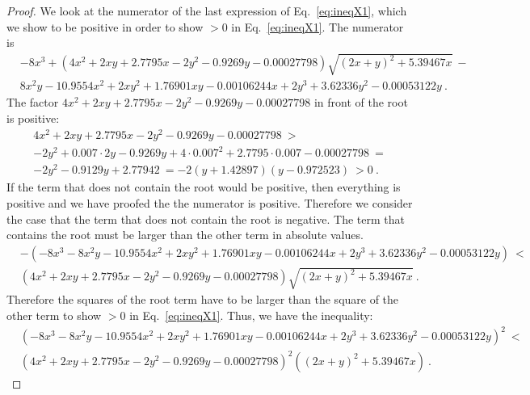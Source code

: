 \documentclass{article}
\begin{document}
\begin{proof}
We look at the numerator of the last expression of 
Eq.~\eqref{eq:ineqX1}, which we show to be
positive in order to show $>0$ in 
Eq.~\eqref{eq:ineqX1}. The numerator is 
\begin{align}
&-8 x^3+\left(4 x^2+2 x y+2.7795 x-2 y^2-0.9269 y-0.00027798\right) \sqrt{(2 x+y)^2+5.39467 x}\ -\\\nonumber &8 x^2 y-10.9554 x^2+2 x y^2+1.76901 x y-0.00106244 x+2 y^3+3.62336 y^2-0.00053122 y \ .
\end{align}
The factor $4 x^2+2 x y+2.7795 x-2 y^2-0.9269 y-0.00027798$
in front of the root is positive:
\begin{align}
4 x^2+2 x y+2.7795 x-2 y^2-0.9269 y-0.00027798 \ > \\ \nonumber
-2 y^2+0.007 \cdot 2 y-0.9269 y+4 \cdot 0.007^2+2.7795 \cdot 0.007-0.00027798  \ = \\ \nonumber
-2 y^2-0.9129 y+2.77942 \ = -2 (y + 1.42897)(y - 0.972523) \ > 0 \ .
\end{align}
If the term that does not contain the root would be positive, 
then everything is positive and we have proofed the the numerator is
positive. Therefore we consider the case that the term that does
not contain the root is negative.
The term that contains the root must be larger than 
the other term in absolute values. 
\begin{align}
&-\left(-8 x^3-8 x^2 y-10.9554 x^2+2 x y^2+1.76901 x y-0.00106244 x+2 y^3+3.62336 y^2-0.00053122 y\right)\ < \\ \nonumber &\left(4 x^2+2 x y+2.7795 x-2 y^2-0.9269 y-0.00027798\right) \sqrt{(2 x+y)^2+5.39467 x} \ . 
\end{align}
Therefore the squares of the root term have to be larger 
than the square of the other term to show $>0$ in 
Eq.~\eqref{eq:ineqX1}.
Thus, we have the inequality:
\begin{align}
&\left(-8 x^3-8 x^2 y-10.9554 x^2+2 x y^2+1.76901 x y-0.00106244 x+2 y^3+3.62336 y^2-0.00053122 y\right)^2\ < \\ \nonumber&\left(4 x^2+2 x y+2.7795 x-2 y^2-0.9269 y-0.00027798\right)^2 \left((2 x+y)^2+5.39467 x\right)\ . 
\end{align}


\end{proof}
\end{document}
